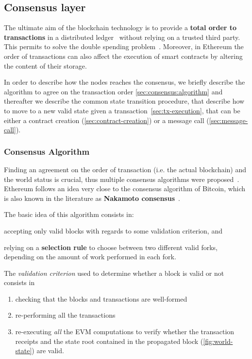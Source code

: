 \subsection{Consensus layer}
\label{sec:consensus}

The ultimate aim of the blockchain technology is to provide a \textbf{total
order to transactions} in a distributed ledger~\cite{bib:the-quest} without
relying on a trusted third party. This permits to solve the double spending
problem~\cite{bib:bitcoin}. Moreover, in Ethereum the order of transactions can
also affect the execution of smart contracts by altering the content of their
storage.

In order to describe how the nodes reaches the consensus, we briefly describe
the algorithm to agree on the transaction order
\autoref{sec:consensus:algorithm} and
thereafter we describe the common state transition 
procedure,
that describe how to move to a new valid state given a
transaction~\autoref{sec:tx-execution}, that can be either
a contract creation (\autoref{sec:contract-creation}) or a message
call (\autoref{sec:message-call}).





\subsubsection{Consensus Algorithm}
\label{sec:consensus:algorithm}

Finding an agreement on the order of transaction (i.e. the actual blockchain)
and the world status is crucial, thus multiple consensus algorithms were
proposed~\cite{bib:the-quest}. Ethereum follows an idea very close to the consensus algorithm
of Bitcoin, which is also known in the literature as \textbf{Nakamoto
consensus}~\cite{bib:bitcoin-ng}.

The basic idea of this algorithm consists in:
\begin{enumerate*}[label=(\arabic*)]
	\item accepting only valid blocks with regards to some validation criterion,
	and
	\item relying on a \textbf{selection rule} to choose between two different
	valid forks, depending on the amount of work performed in each fork.
\end{enumerate*}

The \emph{validation criterion} used to determine whether a block is valid or
not consists in
\begin{enumerate}
	\item checking that the blocks and transactions are well-formed
	\item re-performing all the transactions
	\item re-executing \emph{all}	the EVM computations to verify whether the
	transaction receipts and the state root contained in the propagated block
	(\autoref{fig:world-state}) are valid.
\end{enumerate}

